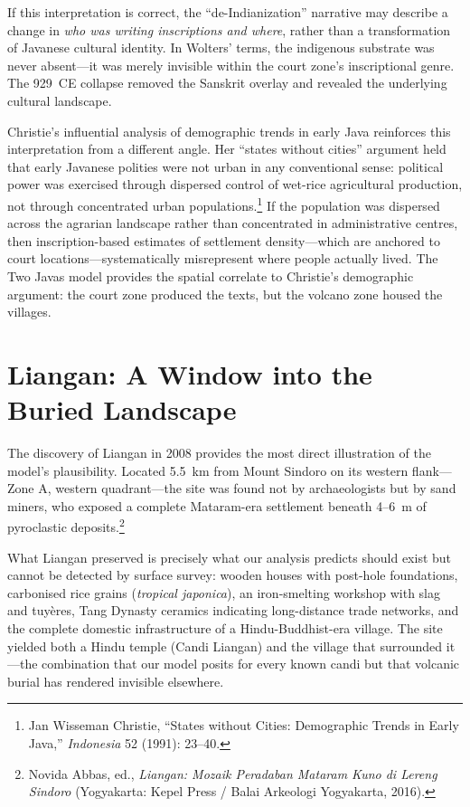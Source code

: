 \documentclass[12pt,a4paper]{article}
\begin{document}
If this interpretation is correct, the ``de-Indianization'' narrative may describe a change in \emph{who was writing inscriptions and where}, rather than a transformation of Javanese cultural identity.
In Wolters' terms, the indigenous substrate was never absent---it was merely invisible within the court zone's inscriptional genre.
The 929~CE collapse removed the Sanskrit overlay and revealed the underlying cultural landscape.

Christie's influential analysis of demographic trends in early Java reinforces this interpretation from a different angle.
Her ``states without cities'' argument held that early Javanese polities were not urban in any conventional sense: political power was exercised through dispersed control of wet-rice agricultural production, not through concentrated urban populations.\footnote{Jan Wisseman Christie, ``States without Cities: Demographic Trends in Early Java,'' \emph{Indonesia} 52 (1991): 23--40.}
If the population was dispersed across the agrarian landscape rather than concentrated in administrative centres, then inscription-based estimates of settlement density---which are anchored to court locations---systematically misrepresent where people actually lived.
The Two Javas model provides the spatial correlate to Christie's demographic argument: the court zone produced the texts, but the volcano zone housed the villages.


\section{Liangan: A Window into the Buried Landscape}

The discovery of Liangan in 2008 provides the most direct illustration of the model's plausibility.
Located 5.5~km from Mount Sindoro on its western flank---Zone A, western quadrant---the site was found not by archaeologists but by sand miners, who exposed a complete Mataram-era settlement beneath 4--6~m of pyroclastic deposits.\footnote{Novida Abbas, ed., \emph{Liangan: Mozaik Peradaban Mataram Kuno di Lereng Sindoro} (Yogyakarta: Kepel Press / Balai Arkeologi Yogyakarta, 2016).}

What Liangan preserved is precisely what our analysis predicts should exist but cannot be detected by surface survey: wooden houses with post-hole foundations, carbonised rice grains (\emph{tropical japonica}), an iron-smelting workshop with slag and tuyères, Tang Dynasty ceramics indicating long-distance trade networks, and the complete domestic infrastructure of a Hindu-Buddhist-era village.
The site yielded both a Hindu temple (Candi Liangan) and the village that surrounded it---the combination that our model posits for every known candi but that volcanic burial has rendered invisible elsewhere.
\end{document}
